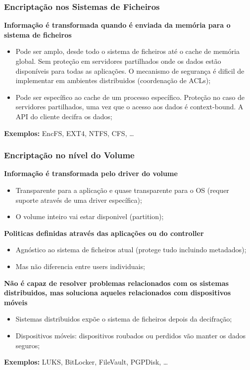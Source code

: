 \documentclass{article}
\begin{document}
\pagebreak

\subsubsection{Encriptação nos Sistemas de Ficheiros}

\begin{flushleft}
  \textbf{Informação é transformada quando é enviada da memória para o
  sistema de ficheiros}
  \begin{itemize}
    \item Pode ser amplo, desde todo o sistema de ficheiros até
    o cache de memória global. Sem proteção em servidores partilhados
    onde os dados estão disponíveis para todas as aplicações.
    O mecanismo de segurança é dificil de implementar em ambientes distribuidos
    (coordenação de ACLs);
    \item Pode ser específico ao cache de um processo específico.
    Proteção no caso de servidores partilhados, uma vez que o acesso aos dados
    é context-bound. A API do cliente decifra os dados;
  \end{itemize}

  \textbf{Exemplos:} EncFS, EXT4, NTFS, CFS, \dots
\end{flushleft}

\subsubsection{Encriptação no nível do Volume}

\begin{flushleft}
  \textbf{Informação é transformada pelo driver do volume}
  \begin{itemize}
    \item Transparente para a aplicação e quase transparente para o OS (requer suporte através de uma driver específica);
    \item O volume inteiro vai estar disponivel (partition);
  \end{itemize}

  \textbf{Politicas definidas através das aplicações ou do controller}
  \begin{itemize}
    \item Agnóstico ao sistema de ficheiros atual (protege tudo incluindo metadados);
    \item Mas não diferencia entre users individuais;
  \end{itemize}

  \textbf{Não é capaz de resolver problemas relacionados com os sistemas
  distribuidos, mas soluciona aqueles relacionados com dispositivos móveis}
  \begin{itemize}
    \item Sistemas distribuidos expõe o sistema de ficheiros depois da decifração;
    \item Dispositivos móveis: dispositivos roubados ou perdidos vão manter os dados seguros;
  \end{itemize}

  \textbf{Exemplos:} LUKS, BitLocker, FileVault, PGPDisk, \dots
\end{flushleft}
\end{document}
